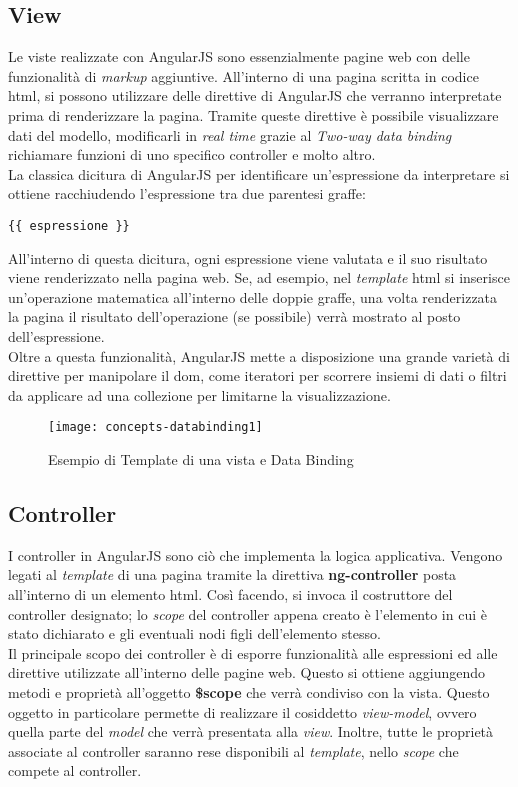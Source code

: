 \subsection{View}
Le viste realizzate con AngularJS sono essenzialmente pagine web con delle funzionalità di \emph{markup} aggiuntive. All'interno di una pagina scritta in codice \gls{html}, si possono utilizzare delle direttive di AngularJS che verranno interpretate prima di renderizzare la pagina. Tramite queste direttive è possibile visualizzare dati del modello, modificarli in \emph{real time} grazie al \emph{Two-way data binding} richiamare funzioni di uno specifico controller e molto altro.\\
La classica dicitura di AngularJS per identificare un'espressione da interpretare si ottiene racchiudendo l'espressione tra due parentesi graffe: 
\begin{verbatim}
{{ espressione }}
\end{verbatim}
All'interno di questa dicitura, ogni espressione viene valutata e il suo risultato viene renderizzato nella pagina web. Se, ad esempio, nel \emph{template} \gls{html} si inserisce un'operazione matematica all'interno delle doppie graffe, una volta renderizzata la pagina il risultato dell'operazione (se possibile) verrà mostrato al posto dell'espressione.\\
Oltre a questa funzionalità, AngularJS mette a disposizione una grande varietà di direttive per manipolare il \gls{dom}, come iteratori per scorrere insiemi di dati o filtri da applicare ad una collezione per limitarne la visualizzazione.

\begin{figure}[!h] 
    \centering 
    \texttt{[image: concepts-databinding1]} 
    \caption{Esempio di Template di una vista e Data Binding}
\end{figure}

\subsection{Controller}
I controller in AngularJS sono ciò che implementa la logica applicativa. Vengono legati al \emph{template} di una pagina tramite la direttiva \textbf{ng-controller} posta all'interno di un elemento \gls{html}. Così facendo, si invoca il costruttore del controller designato; lo \emph{scope} del controller appena creato è l'elemento in cui è stato dichiarato e gli eventuali nodi figli dell'elemento stesso.\\
Il principale scopo dei controller è di esporre funzionalità alle espressioni ed alle direttive utilizzate all'interno delle pagine web. Questo si ottiene aggiungendo metodi e proprietà all'oggetto \textbf{\$scope} che verrà condiviso con la vista. Questo oggetto in particolare permette di realizzare il cosiddetto \emph{view-model}, ovvero quella parte del \emph{model} che verrà presentata alla \emph{view}. Inoltre, tutte le proprietà associate al controller saranno rese disponibili al \emph{template}, nello \emph{scope} che compete al controller.

